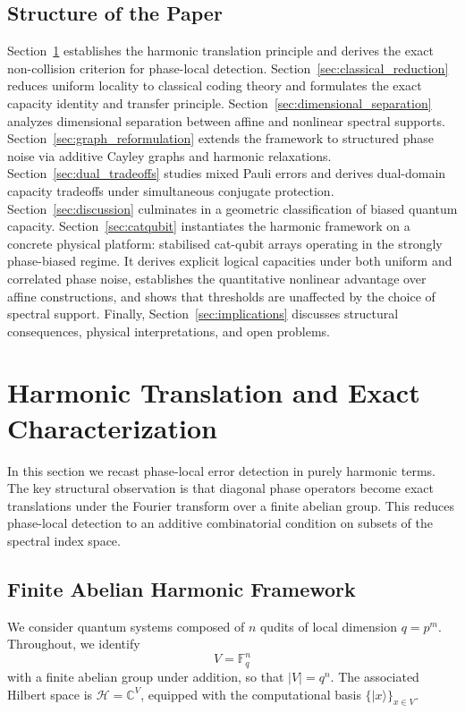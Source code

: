 \documentclass[a4paper,twocolumn,11pt,allowtoday]{quantumarticle}
\theoremstyle{plain}
\theoremstyle{definition}
\theoremstyle{remark}
\begin{document}
\subsection{Structure of the Paper}
\label{subsec:structure}

Section~\ref{sec:harmonic} establishes the harmonic translation principle and derives the exact non-collision criterion for phase-local detection. Section~\ref{sec:classical_reduction} reduces uniform locality to classical coding theory and formulates the exact capacity identity and transfer principle. Section~\ref{sec:dimensional_separation} analyzes dimensional separation between affine and nonlinear spectral supports. Section~\ref{sec:graph_reformulation} extends the framework to structured phase noise via additive Cayley graphs and harmonic relaxations. Section~\ref{sec:dual_tradeoffs} studies mixed Pauli errors and derives dual-domain capacity tradeoffs under simultaneous conjugate protection. Section~\ref{sec:discussion} culminates in a geometric classification of biased quantum capacity. Section~\ref{sec:catqubit} instantiates the harmonic framework on a concrete physical platform: stabilised cat-qubit arrays operating in the strongly phase-biased regime. It derives explicit logical capacities under both uniform and correlated phase noise, establishes the quantitative nonlinear advantage over affine constructions, and shows that thresholds are unaffected by the choice of spectral support. Finally, Section~\ref{sec:implications} discusses structural consequences, physical interpretations, and open problems.


\section{Harmonic Translation and Exact Characterization}
\label{sec:harmonic}

In this section we recast phase-local error detection in purely harmonic terms. 
The key structural observation is that diagonal phase operators become exact translations under the Fourier transform over a finite abelian group. 
This reduces phase-local detection to an additive combinatorial condition on subsets of the spectral index space.

\subsection{Finite Abelian Harmonic Framework}
\label{subsec:harmonic_framework}

We consider quantum systems composed of $n$ qudits of local dimension $q=p^m$. 
Throughout, we identify
\[
V=\mathbb{F}_q^n
\]
with a finite abelian group under addition, so that $|V|=q^n$. 
The associated Hilbert space is $\mathcal{H}=\mathbb{C}^{V}$, equipped with the computational basis $\{|x\rangle\}_{x\in V}$.
\end{document}
